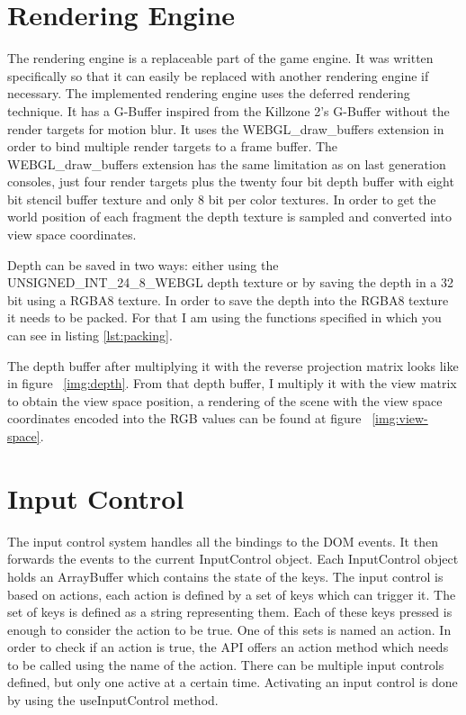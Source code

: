 \section{Rendering Engine}

The rendering engine is a replaceable part of the game engine. It was written specifically so that it can easily be replaced with another rendering engine if necessary.
The implemented rendering engine uses the deferred rendering technique. It has a G-Buffer inspired from the Killzone 2’s G-Buffer without the render targets for motion blur.
It uses the WEBGL\_draw\_buffers extension in order to bind multiple render targets to a frame buffer. The WEBGL\_draw\_buffers extension has the same limitation as on last generation consoles, just four render targets plus the twenty four bit depth buffer with eight bit stencil buffer texture and only 8 bit per color textures.
In order to get the world position of each fragment the depth texture is sampled and converted into view space coordinates.

Depth can be saved in two ways: either using the UNSIGNED\_INT\_24\_8\_WEBGL depth texture or by saving the depth in a 32 bit using a RGBA8 texture.
In order to save the depth into the RGBA8 texture it needs to be packed. For that I am using the functions specified in \cite{engel14} which you can see in listing \ref{lst:packing}.

\lstset{caption=RGBA8 packing, label=lst:packing}


The depth buffer after multiplying it with the reverse projection matrix looks like in figure ~\ref{img:depth}.
From that depth buffer, I multiply it with the view matrix to obtain the view space position, a rendering of the scene with the view space coordinates encoded into the RGB values can be found at figure ~\ref{img:view-space}.

\section{Input Control}

The input control system handles all the bindings to the DOM events. It then forwards the events to the current InputControl object. 
Each InputControl object holds an ArrayBuffer which contains the state of the keys. The input control is based on actions, each action is defined by a set of keys which can trigger it. The set of keys is defined as a string representing them. Each of these keys pressed is enough to consider the action to be true. One of this sets is named an action. In order to check if an action is true, the API offers an action method which needs to be called using the name of the action. There can be multiple input controls defined, but only one active at a certain time. Activating an input control is done by using the useInputControl method. 


